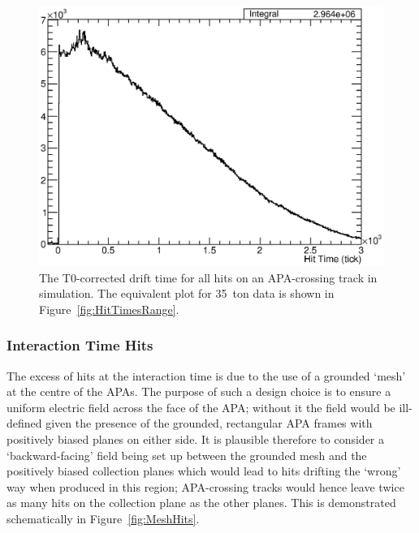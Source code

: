 \begin{figure}
  \centering
  \includegraphics[width=12cm]{HitTimesMC.eps}
  \caption[The T0-corrected drift time for all hits on an APA-crossing track in simulation.]{The T0-corrected drift time for all hits on an APA-crossing track in simulation.  The equivalent plot for 35~ton data is shown in Figure~\ref{fig:HitTimesRange}.}
  \label{fig:HitTimesMC}
\end{figure}

\subsubsection{Interaction Time Hits}\label{sec:InteractionTimeHits}

The excess of hits at the interaction time is due to the use of a grounded `mesh' at the centre of the APAs.  The purpose of such a design choice is to ensure a uniform electric field across the face of the APA; without it the field would be ill-defined given the presence of the grounded, rectangular APA frames with positively biased planes on either side.  It is plausible therefore to consider a `backward-facing' field being set up between the grounded mesh and the positively biased collection planes which would lead to hits drifting the `wrong' way when produced in this region; APA-crossing tracks would hence leave twice as many hits on the collection plane as the other planes.  This is demonstrated schematically in Figure~\ref{fig:MeshHits}.

